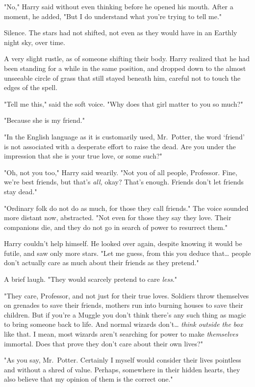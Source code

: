 "No," Harry said without even thinking before he opened his mouth. After a
moment, he added, "But I do understand what you're trying to tell me."

Silence. The stars had not shifted, not even as they would have in an Earthly
night sky, over time.

A very slight rustle, as of someone shifting their body. Harry realized that he
had been standing for a while in the same position, and dropped down to the
almost unseeable circle of grass that still stayed beneath him, careful not to
touch the edges of the spell.

"Tell me this," said the soft voice. "Why does that girl matter to you so much?"

"Because she is my friend."

"In the English language as it is customarily used, Mr.~Potter, the word
`friend' is not associated with a desperate effort to raise the dead. Are you
under the impression that she is your true love, or some such?"

"Oh, not you too," Harry said wearily. "Not you of all people, Professor. Fine,
we're best friends, but that's \emph{all,} okay? That's enough. Friends don't
let friends stay dead."

"Ordinary folk do not do as much, for those they call friends." The voice
sounded more distant now, abstracted. "Not even for those they say they love.
Their companions die, and they do not go in search of power to resurrect them."

Harry couldn't help himself. He looked over again, despite knowing it would be
futile, and saw only more stars. "Let me guess, from this you deduce
that{\ldots} people don't actually care as much about their friends as they
pretend."

A brief laugh. "They would scarcely pretend to care \emph{less}."

"They care, Professor, and not just for their true loves. Soldiers throw
themselves on grenades to save their friends, mothers run into burning houses
to save their children. But if you're a Muggle you don't think there's any such
thing as magic to bring someone back to life. And normal wizards don't{\ldots}
\emph{think outside the box} like that. I mean, most wizards aren't searching
for power to make \emph{themselves} immortal. Does that prove they don't care
about their own lives?"

"As you say, Mr.~Potter. Certainly I myself would consider their lives
pointless and without a shred of value. Perhaps, somewhere in their hidden
hearts, they also believe that my opinion of them is the correct one."

